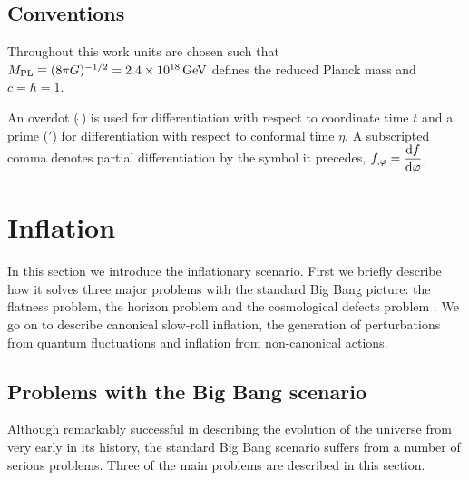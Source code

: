 \subsection{Conventions}
\label{sec:conventions}
Throughout this work units are chosen such that $M_{\mathrm{PL}} \equiv (8\pi G )^{-1/2}=
2 
.4 \times 10^{18}\, {\rm GeV}$ 
defines the reduced Planck mass and $c=\hbar =1$. 

An overdot ($\dot{~}$) is used for differentiation with respect to coordinate
time $t$ and a prime ($'$) for differentiation with respect to conformal time
$\eta$. A subscripted comma denotes partial differentiation by the symbol it
precedes, \eg $f_{,\varphi} = \dfrac{\mathrm{d} f}{\mathrm{d} \varphi}$.




\section{Inflation}
\label{sec:inflation-intro}
In this section we introduce the inflationary scenario. First we briefly
describe how it solves three major problems with the standard Big Bang
picture: the flatness problem, the horizon problem and the cosmological defects
problem \cite{book:liddle}. We go on to describe canonical slow-roll
inflation, the generation of
perturbations from quantum fluctuations and inflation from non-canonical
actions.

\subsection{Problems with the Big Bang scenario}
Although remarkably successful in describing the evolution of the universe from
very early in its history, the standard Big Bang scenario suffers from a number
of serious problems. Three of the main problems are described in this section.


